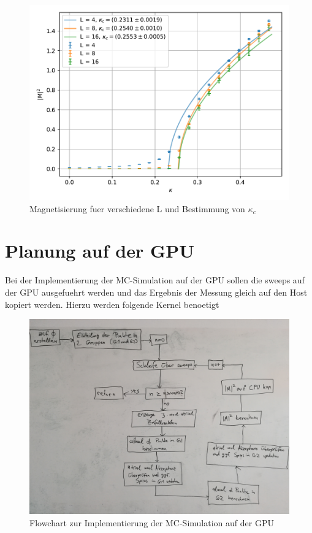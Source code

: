 \documentclass[10pt,a4paper]{article}
\begin{document}
\begin{figure}%
  \centering
  \includegraphics[width=\textwidth]{../figures/mag_over_kappa.pdf}
  \caption{Magnetisierung fuer verschiedene L und Bestimmung von $\kappa_c$}\label{fig:fit}
\end{figure}

\section{Planung auf der GPU}

Bei der Implementierung der MC-Simulation auf der GPU sollen die sweeps auf der GPU ausgefuehrt werden und das Ergebnis der Messung gleich
auf den Host kopiert werden. Hierzu werden folgende Kernel benoetigt


\begin{figure}
  \centering
  \includegraphics[width=\textwidth]{../figures/flowchart.jpg}
  \caption{Flowchart zur Implementierung der MC-Simulation auf der GPU}\label{fig:flowchart}
\end{figure}
\end{document}
